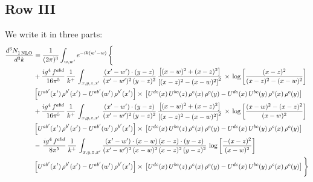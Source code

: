 \documentclass[9pt]{article}
\numberwithin{equation}{section}
\begin{document}
\subsection{Row III}
We write it in three parts:
\begin{align}
   \frac{d^{3}N_{1\,\rm NLO}^{\rm}}{d^{3}k}  & =  \frac{1}{(2\pi)^{3}}  \int_{w, w^\prime} e^{-ik(w^\prime-w)}\, \Bigg\{\notag \\
&  +\frac{ig^{4}\,f^{abd}}{16\pi^{5}}\, \frac{1}{k^{+}}\,\int_{x,y,z,x'}\, \frac{(x'-w')\cdot (y-z)}{(x'-w')^{2}\,(y-z)^{2}}\, \frac{\left[(x-w)^{2}+(x-z)^{2}\right]}{\left[(x-z)^{2}-(x-w)^{2}\right]^{2}}\, \times\, \log{\left[\frac{(x-z)^{2}}{(x-z)^{2}-(x-w)^{2}}\right]}\notag \\ & \left[U^{ab'}(x')\,\rho^{b'}(x')-U^{ab'}(w')\, \rho^{b'}(x')\right]\times\, \left[U^{de}(x)\,U^{bc}(z)\, \rho^{e}(x)\,\rho^{c}(y)-U^{de}(x)\,U^{bc}(y)\,\rho^{e}(x)\,\rho^{c}(y)\right] \notag \\
&  +\frac{ig^{4}\,f^{abd}}{16\pi^{5}}\, \frac{1}{k^{+}}\,\int_{x,y,z,x'}\, \frac{(x'-w')\cdot (y-z)}{(x'-w')^{2}\,(y-z)^{2}}\, \frac{\left[(x-w)^{2}+(x-z)^{2}\right]}{\left[(x-z)^{2}-(x-w)^{2}\right]^{2}}\, \times\, \log{\left[\frac{(x-w)^{2}-(x-z)^{2}}{(x-w)^{2}}\right]}\notag \\ & \left[U^{ab'}(x')\,\rho^{b'}(x')-U^{ab'}(w')\, \rho^{b'}(x')\right]\times\, \left[U^{de}(x)\,U^{bc}(z)\, \rho^{e}(x)\,\rho^{c}(y)-U^{de}(x)\,U^{bc}(y)\,\rho^{e}(x)\,\rho^{c}(y)\right] \notag \\
&-\, \frac{ig^{4}\,f^{abd}}{8\pi^{5}}\,\frac{1}{k^{+}}\,\int_{x,y,z,x'}\frac{(x'-w')\cdot (x-w)\, (x-z)\cdot (y-z)}{(x'-w')^{2}\, (x-w)^{2}\, (x-z)^{2}\, (y-z)^{2}}\,\log{\left[\frac{-(x-z)^{2}}{(x-w)^{2}}\right]} \notag \\ & \left[U^{ab'}(x')\,\rho^{b'}(x')-U^{ab'}(w')\, \rho^{b'}(x')\right]\times\, \left[U^{de}(x)\,U^{bc}(z)\, \rho^{e}(x)\,\rho^{c}(y)-U^{de}(x)\,U^{bc}(y)\,\rho^{e}(x)\,\rho^{c}(y)\right]\Bigg\}
\end{align}
\end{document}
